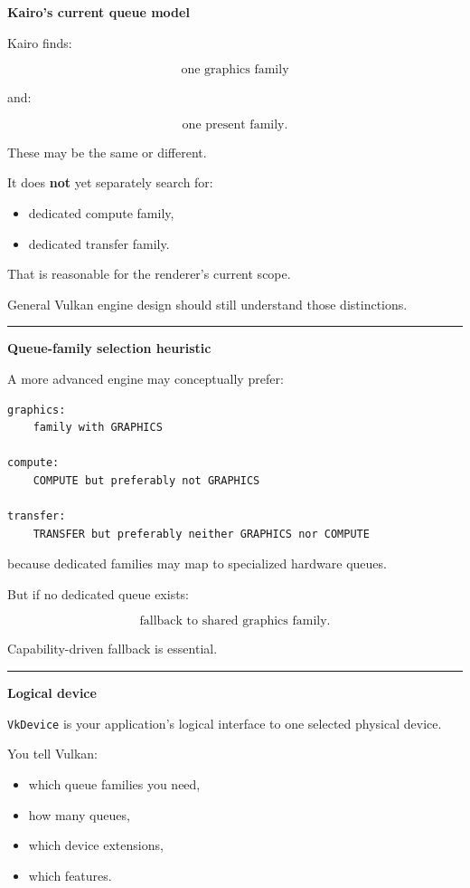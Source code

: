 \textbf{Kairo's current queue model}

Kairo finds:

\[
\boxed{
\text{one graphics family}
}
\]

and:

\[
\boxed{
\text{one present family}.
}
\]

These may be the same or different.

It does \textbf{not} yet separately search for:

\begin{itemize}
\tightlist
\item
  dedicated compute family,
\item
  dedicated transfer family.
\end{itemize}

That is reasonable for the renderer's current scope.

General Vulkan engine design should still understand those distinctions.

\begin{center}\rule{0.5\linewidth}{0.5pt}\end{center}

\textbf{Queue-family selection heuristic}

A more advanced engine may conceptually prefer:

\begin{verbatim}
graphics:
    family with GRAPHICS

compute:
    COMPUTE but preferably not GRAPHICS

transfer:
    TRANSFER but preferably neither GRAPHICS nor COMPUTE
\end{verbatim}

because dedicated families may map to specialized hardware queues.

But if no dedicated queue exists:

\[
\boxed{
\text{fallback to shared graphics family}.
}
\]

Capability-driven fallback is essential.

\begin{center}\rule{0.5\linewidth}{0.5pt}\end{center}

\textbf{Logical device}

\texttt{VkDevice} is your application's logical interface to one selected physical device.

You tell Vulkan:

\begin{itemize}
\tightlist
\item
  which queue families you need,
\item
  how many queues,
\item
  which device extensions,
\item
  which features.
\end{itemize}

